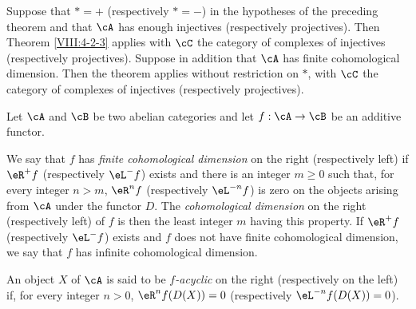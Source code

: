 
\begin{corollary}\label{VIII:4-2-3-1} %
Suppose that $\ast=+$ (respectively $\ast=-$) in the hypotheses of the
preceding theorem and that $\cA$ has enough injectives (respectively
projectives). Then Theorem \ref{VIII:4-2-3} applies with $\cC$ the
category of complexes of injectives (respectively projectives). Suppose
in addition that $\cA$ has finite cohomological dimension. Then the
theorem applies without restriction on $\ast$, with $\cC$ the category
of complexes of injectives (respectively projectives).
\end{corollary}

\begin{definition}\label{VIII:4-2-5} %
Let $\cA$ and $\cB$ be two abelian categories and let $f:\cA\to \cB$ be
an additive functor.

We say that $f$ has \emph{finite cohomological dimension} on the right
(respectively left) if $\eR^+ f$ (respectively $\eL^- f$)
exists and there is an integer $m\geqslant 0$ such that, for every integer
$n>m$, $\eR^n f$ (respectively $\eL^{-n} f$) is zero on the objects
arising from $\cA$ under the functor $D$. The
\emph{cohomological dimension} on the right (respectively left) of $f$ is then the
least integer $m$ having this property. If $\eR^+ f$ (respectively
$\eL^- f$) exists and $f$ does not have finite cohomological dimension,
we say that $f$ has infinite cohomological dimension.

An object $X$ of $\cA$ is said to be \emph{$f$-acyclic} on the right
(respectively on the left) if, for every integer $n>0$,
$\eR^n f(D(X)) = 0$ (respectively $\eL^{-n} f(D(X))=0$).
\end{definition}


